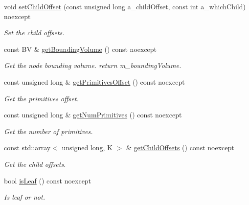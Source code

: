 \begin{DoxyCompactItemize}
void \hyperlink{classBVH_1_1LinearNodeT_a3a972ef5ea9abc6e2ead9f453e233e2f}{set\+Child\+Offset} (const unsigned long a\+\_\+child\+Offset, const int a\+\_\+which\+Child) noexcept
\begin{DoxyCompactList}\small\item\em Set the child offsets. \end{DoxyCompactList}\item 
\mbox{\label{classBVH_1_1LinearNodeT_a152b12723c86f8fcb7522562cd97cd67}} 
const BV \& \hyperlink{classBVH_1_1LinearNodeT_a152b12723c86f8fcb7522562cd97cd67}{get\+Bounding\+Volume} () const noexcept
\begin{DoxyCompactList}\small\item\em Get the node bounding volume. return m\+\_\+bounding\+Volume. \end{DoxyCompactList}\item 
const unsigned long \& \hyperlink{classBVH_1_1LinearNodeT_a8cfca65bd808adc8eb2793e7d7aabcd3}{get\+Primitives\+Offset} () const noexcept
\begin{DoxyCompactList}\small\item\em Get the primitives offset. \end{DoxyCompactList}\item 
const unsigned long \& \hyperlink{classBVH_1_1LinearNodeT_a245e67b6824cadf1733c3c9176259106}{get\+Num\+Primitives} () const noexcept
\begin{DoxyCompactList}\small\item\em Get the number of primitives. \end{DoxyCompactList}\item 
const std\+::array$<$ unsigned long, K $>$ \& \hyperlink{classBVH_1_1LinearNodeT_af08feacbaa148425a896c196b0b6d1da}{get\+Child\+Offsets} () const noexcept
\begin{DoxyCompactList}\small\item\em Get the child offsets. \end{DoxyCompactList}\item 
\mbox{\label{classBVH_1_1LinearNodeT_aba361834e3d013725a92ec4b45633584}} 
bool \hyperlink{classBVH_1_1LinearNodeT_aba361834e3d013725a92ec4b45633584}{is\+Leaf} () const noexcept
\begin{DoxyCompactList}\small\item\em Is leaf or not. \end{DoxyCompactList}\item 

\end{DoxyCompactItemize}
